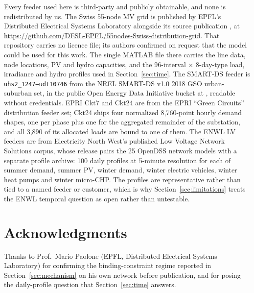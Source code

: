 \documentclass[review,authoryear,12pt]{elsarticle}
\begin{document}
Every feeder used here is third-party and publicly obtainable, and none is
redistributed by us. The Swiss 55-node MV grid is published by EPFL's
Distributed Electrical Systems Laboratory alongside its source publication
\citep{yi2022}, at
\url{https://github.com/DESL-EPFL/55nodes-Swiss-distribution-grid}. That
repository carries no licence file; its authors confirmed on request that the
model could be used for this work. The single
MATLAB file there carries the line data, node locations, PV and hydro
capacities, and the 96-interval $\times$ 8-day-type load, irradiance and hydro
profiles used in Section~\ref{sec:time}. The SMART-DS feeder is
\texttt{uhs2\_1247--udt10746} from the NREL SMART-DS v1.0 2018 GSO
urban-suburban set, in the public Open Energy Data Initiative bucket at
,
readable without credentials. EPRI Ckt7 and Ckt24 are from the EPRI
``Green Circuits'' distribution feeder set; Ckt24 ships four normalized
8{,}760-point hourly demand shapes, one per phase plus one for the aggregated
remainder of the substation, and all 3{,}890 of its allocated loads are bound
to one of them. The ENWL LV feeders are from Electricity North West's published
Low Voltage Network Solutions corpus, whose release pairs the 25 OpenDSS
network models with a separate profile archive: 100 daily profiles at 5-minute
resolution for each of summer demand, summer PV, winter demand, winter electric
vehicles, winter heat pumps and winter micro-CHP. The profiles are
representative rather than tied to a named feeder or customer, which is why
Section~\ref{sec:limitations} treats the ENWL temporal question as open rather
than untestable.

\section*{Acknowledgments}
Thanks to Prof.\ Mario Paolone (EPFL, Distributed Electrical Systems
Laboratory) for confirming the binding-constraint regime reported in
Section~\ref{sec:mechanism} on his own network before publication, and for
posing the daily-profile question that Section~\ref{sec:time} answers.

\end{document}
